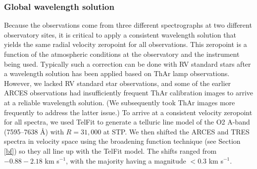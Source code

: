 \subsubsection{Global wavelength solution}\label{wavelength}
Because the observations come from three different spectrographs at two different observatory sites, it is critical to apply a consistent wavelength solution that yields the same radial velocity zeropoint for all observations. This zeropoint is a function of the atmospheric conditions at the observatory and the instrument being used. Typically such a correction can be done with RV standard stars after a wavelength solution has been applied based on ThAr lamp observations. However, we lacked RV standard star observations, and some of the earlier ARCES observations had insufficiently frequent ThAr calibration images to arrive at a reliable wavelength solution. (We subsequently took ThAr images more frequently to address the latter issue.) To arrive at a consistent velocity zeropoint for all spectra, we used TelFit \citep{gul14} to generate a telluric line model of the O2 A-band (7595--7638 \AA) with $R = 31,000$ at STP. We then shifted the ARCES and TRES spectra in velocity space using the broadening function technique (see Section \ref{bf}) so they all line up with the TelFit model. The shifts ranged from $-0.88 - 2.18$ km s$^{-1}$, with the majority having a magnitude $< 0.3$ km s$^{-1}$.
  
  
  
  
  